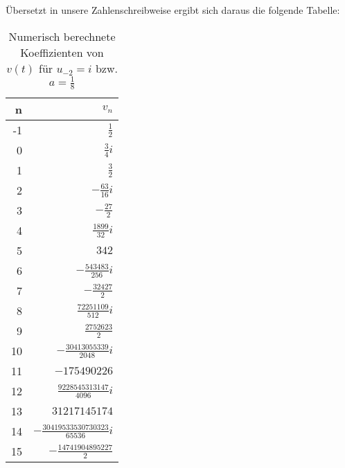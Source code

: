 Übersetzt in unsere Zahlenschreibweise ergibt sich daraus die folgende Tabelle:
\renewcommand{\arraystretch}{1.15}
\begin{table}[H] %
\begin{center}
\begin{tabular}{|r||r|}
\hline
n        & $v_n$
\\\hline\hline
  -1 & $\frac{1}{2}$
\\0  & $\frac{3}{4}i$
\\1  & $\frac{3}{2}$
\\2  & $-\frac{63}{16}i$
\\3  & $-\frac{27}{2}$
\\4  & $\frac{1899}{32}i$
\\5  & $342$
\\6  & $-\frac{543483}{256}i$
\\7  & $-\frac{32427}{2}$
\\8  & $\frac{72251109}{512}i$
\\9  & $\frac{2752623}{2}$
\\10 & $-\frac{30413055339}{2048}i$
\\11 & $-175490226$
\\12 & $\frac{9228545313147}{4096}i$
\\13 & $31217145174$
\\14 & $-\frac{30419533530730323}{65536}i$
\\15 & $-\frac{14741904895227}{2}$
\\\hline
\end{tabular}
\caption{Numerisch berechnete Koeffizienten von $v(t)$ für $u_{-2}=i$ bzw.
  $a=\frac{1}{8}$}
\label{tab:koeff_a=0.125}
\end{center}
\end{table}

